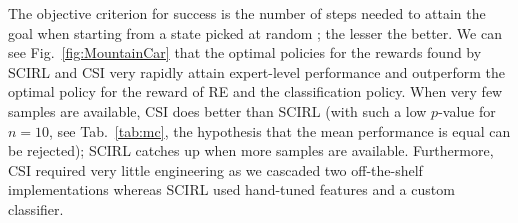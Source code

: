 \documentclass{llncs}
\providecommand{\e}[1]{\ensuremath{\times 10^{#1}}}
\begin{document}
The objective criterion for success is the number of steps needed to attain the goal when starting from a state picked at random ; the lesser the better. We can see Fig.~\ref{fig:MountainCar} that the optimal policies for the rewards found by SCIRL and CSI very rapidly attain expert-level performance and outperform the optimal policy for the reward of RE and the classification policy. When very few samples are available, CSI does better than SCIRL (with such a low $p$-value for $n=10$, see Tab.~\ref{tab:mc}, the hypothesis that the mean performance is equal can be rejected); SCIRL catches up when more samples are available. Furthermore, CSI required very little engineering as we cascaded two off-the-shelf implementations whereas SCIRL used hand-tuned features and a custom classifier.
\begin{table}
  \small
  \hfill
  \caption{Student or Welch test of mean equality (depending on whether a Bartlett test of variance equality succeeds) $p$-values for CSI and SCIRL on the mountain car (\ref{tab:mc}) and the highway driving simulator (\ref{tab:highway}). High values ($>1.0\e{-02}$) means that the hypothesis that the means are equal cannot be rejected.}
\end{table}
\end{document}

